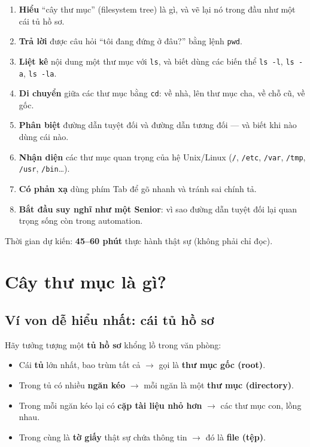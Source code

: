 \documentclass[12pt,a4paper]{article}
\begin{document}
\begin{enumerate}[leftmargin=*]
  \item \textbf{Hiểu} ``cây thư mục'' (filesystem tree) là gì, và vẽ lại nó trong đầu như một cái tủ hồ sơ.
  \item \textbf{Trả lời} được câu hỏi ``tôi đang đứng ở đâu?'' bằng lệnh \texttt{pwd}.
  \item \textbf{Liệt kê} nội dung một thư mục với \texttt{ls}, và biết dùng các biến thể \texttt{ls -l}, \texttt{ls -a}, \texttt{ls -la}.
  \item \textbf{Di chuyển} giữa các thư mục bằng \texttt{cd}: về nhà, lên thư mục cha, về chỗ cũ, về gốc.
  \item \textbf{Phân biệt} đường dẫn tuyệt đối và đường dẫn tương đối --- và biết khi nào dùng cái nào.
  \item \textbf{Nhận diện} các thư mục quan trọng của hệ Unix/Linux (\texttt{/}, \texttt{/etc}, \texttt{/var}, \texttt{/tmp}, \texttt{/usr}, \texttt{/bin}\ldots).
  \item \textbf{Có phản xạ} dùng phím Tab để gõ nhanh và tránh sai chính tả.
  \item \textbf{Bắt đầu suy nghĩ như một Senior}: vì sao đường dẫn tuyệt đối lại quan trọng sống còn trong automation.
\end{enumerate}

\noindent Thời gian dự kiến: \textbf{45--60 phút} thực hành thật sự (không phải chỉ đọc).

\section{Cây thư mục là gì?}

\subsection{Ví von dễ hiểu nhất: cái tủ hồ sơ}

Hãy tưởng tượng một \textbf{tủ hồ sơ} khổng lồ trong văn phòng:

\begin{itemize}[leftmargin=*]
  \item Cái \textbf{tủ} lớn nhất, bao trùm tất cả $\rightarrow$ gọi là \textbf{thư mục gốc (root)}.
  \item Trong tủ có nhiều \textbf{ngăn kéo} $\rightarrow$ mỗi ngăn là một \textbf{thư mục (directory)}.
  \item Trong mỗi ngăn kéo lại có \textbf{cặp tài liệu nhỏ hơn} $\rightarrow$ các thư mục con, lồng nhau.
  \item Trong cùng là \textbf{tờ giấy} thật sự chứa thông tin $\rightarrow$ đó là \textbf{file (tệp)}.
\end{itemize}
\end{document}
